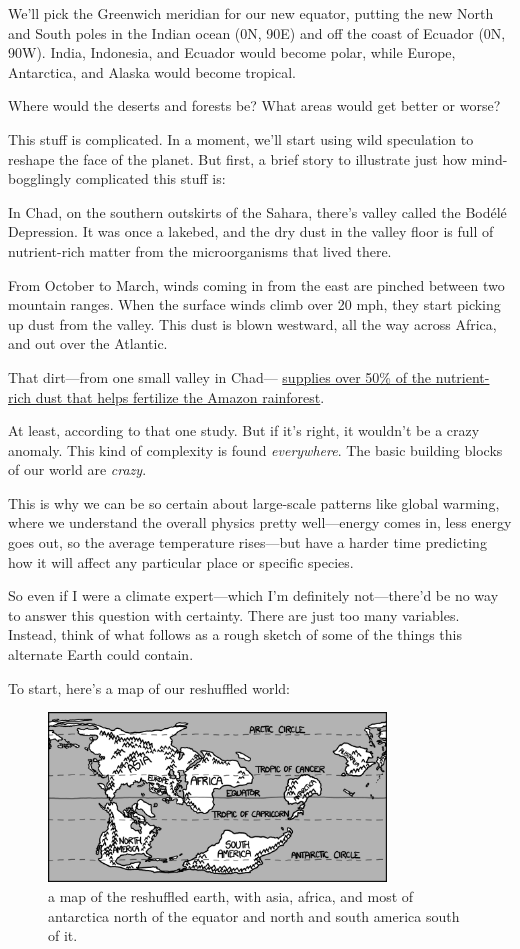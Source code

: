 {We’ll pick the Greenwich meridian for our new equator, putting the new North and South poles in the Indian ocean (0N, 90E) and off the coast of Ecuador (0N, 90W). India, Indonesia, and Ecuador would become polar, while Europe, Antarctica, and Alaska would become tropical.}

{Where would the deserts and forests be? What areas would get better or worse?}

{This stuff is complicated. In a moment, we'll start using wild speculation to reshape the face of the planet. But first, a brief story to illustrate just how mind-bogglingly complicated this stuff is:}

{In Chad, on the southern outskirts of the Sahara, there’s valley called the Bodélé Depression. It was once a lakebed, and the dry dust in the valley floor is full of nutrient-rich matter from the microorganisms that lived there.}

{From October to March, winds coming in from the east are pinched between two mountain ranges. When the surface winds climb over 20 mph, they start picking up dust from the valley. This dust is blown westward, all the way across Africa, and out over the Atlantic.}

{That dirt—from one small valley in Chad— \href{http://iopscience.iop.org/1748-9326/1/1/014005}{supplies over 50\% of the nutrient-rich dust that helps fertilize the Amazon rainforest}.}

{At least, according to that one study. But if it's right, it wouldn’t be a crazy anomaly. This kind of complexity is found \emph{everywhere}. The basic building blocks of our world are \emph{crazy}.}

{This is why we can be so certain about large-scale patterns like global warming, where we understand the overall physics pretty well—energy comes in, less energy goes out, so the average temperature rises—but have a harder time predicting how it will affect any particular place or specific species.}

{So even if I were a climate expert—which I’m definitely not—there’d be no way to answer this question with certainty. There are just too many variables. Instead, think of what follows as a rough sketch of some of the things this alternate Earth could contain.}

{To start, here’s a map of our reshuffled world:}

\begin{figure}[!htbp]
\centering
\includegraphics[scale=0.5, max width=0.8\textwidth]{imgs/a/10/cassini_blank.png}
\caption{a map of the reshuffled earth, with asia, africa, and most of antarctica north of the equator and north and south america south of it.}
\end{figure}

